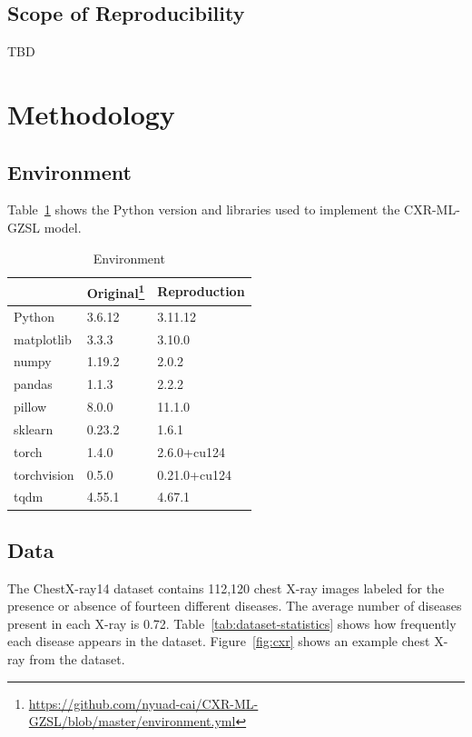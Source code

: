 \documentclass[letterpaper]{article} %
\begin{document}
\subsection{Scope of Reproducibility}

TBD

\section{Methodology}

\subsection{Environment}

Table~\ref{tab:environment} shows the Python version and libraries used to implement the CXR-ML-GZSL model.

\begin{table}[h!]
\centering
\begin{tabular}{|l|l|l|}
\hline
\textbf{} & \textbf{Original\footnote{\url{https://github.com/nyuad-cai/CXR-ML-GZSL/blob/master/environment.yml}}} & \textbf{Reproduction} \\
\hline
Python & 3.6.12 & 3.11.12 \\
matplotlib & 3.3.3 & 3.10.0 \\
numpy & 1.19.2 & 2.0.2 \\
pandas & 1.1.3 & 2.2.2 \\
pillow & 8.0.0 & 11.1.0 \\
sklearn & 0.23.2 & 1.6.1 \\
torch & 1.4.0 & 2.6.0+cu124 \\
torchvision & 0.5.0 & 0.21.0+cu124 \\
tqdm & 4.55.1 & 4.67.1 \\
\hline
\end{tabular}
\caption{Environment}
\label{tab:environment}
\end{table}

\subsection{Data}

The ChestX-ray14 dataset \cite{Wang_2017} contains 112,120 chest X-ray images labeled for the presence or absence of fourteen different diseases. The average number of diseases present in each X-ray is 0.72. Table~\ref{tab:dataset-statistics} shows how frequently each disease appears in the dataset. Figure~\ref{fig:cxr} shows an example chest X-ray from the dataset.
\end{document}
